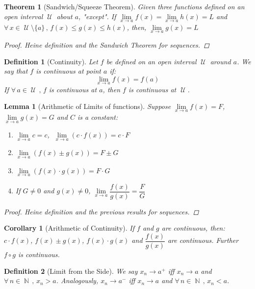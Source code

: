 \documentclass[12pt]{article}
\newcommand{\Forall}[1]{\forall\,{#1}\,,\,}
\DeclareMathOperator{\N}{\mathbb{N}}
\DeclareMathOperator{\U}{\mathcal{U}}
\newtheorem{theorem}{Theorem}[subsection]
\newtheorem{definition}{Definition}[subsection]
\newtheorem{lemma}{Lemma}[subsection]
\newtheorem{corollary}{Corollary}[subsection]
\begin{document}
\begin{theorem}[Sandwich/Squeeze Theorem]
  Given three functions defined on an open interval $\U$ about $a$, "except". If $\lim\limits_{x\to a}f(x) =\lim\limits_{x\to a}h(x) = L$ and $\Forall{x\in\U\setminus\{a\}} f(x)\leq g(x)\leq h(x)$, then, $\lim\limits_{x\to a}g(x) = L$
  \begin{proof}
    Heine definition and the Sandwich Theorem for sequences.
  \end{proof}
\end{theorem}

\begin{definition}[Continuity]
  Let $f$ be defined on an open interval $\U$ around $a$. We say that $f$ is continuous at point $a$ if:
  $$\lim_{x\to a}f(x)=f(a)$$
  If $\Forall{a\in\U} f$ is continuous at $a$, then $f$ is continuous at $\U$.
\end{definition}

\begin{lemma}[Arithmetic of Limits of functions]
  Suppose $\lim\limits_{x\to a}f(x)=F$, $\lim\limits_{x\to a}g(x)=G$ and $C$ is a constant:
  \begin{enumerate}
    \item $\lim\limits_{x\to a} c=c$, $\;\lim\limits_{x\to a} (c\cdot f(x))=c\cdot F$
    \item $\lim\limits_{x\to a} (f(x)\pm g(x))=F\pm G$
    \item $\lim\limits_{x\to a} (f(x)\cdot g(x))=F\cdot G$
    \item If $G\neq 0$ and $g(x)\neq 0$, $\lim\limits_{x\to a} \dfrac{f(x)}{g(x)}=\dfrac{F}{G}$ 
  \end{enumerate}
  \begin{proof}
    Heine definition and the previous results for sequences.
  \end{proof}
\end{lemma}

\begin{corollary}[Arithmetic of Continuity]
  If $f$ and $g$ are continuous, then: $c\cdot f(x)$, $f(x)\pm g(x)$, $f(x)\cdot g(x)$ and $\dfrac{f(x)}{g(x)}$ are continuous. Further $f\circ g$ is continuous.
\end{corollary}

\begin{definition}[Limit from the Side]
  We say $x_n\to a^{+}$ iff $x_n\to a$ and $\Forall{n\in\N}x_n>a$. Analogously, $x_n\to a^{-}$ iff $x_n\to a$ and $\Forall{n\in\N}x_n<a$.
\end{definition}
\end{document}
